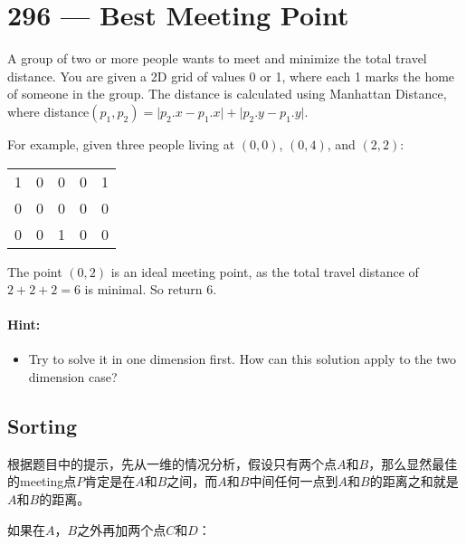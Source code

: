 \section{296 --- Best Meeting Point}
A group of two or more people wants to meet and minimize the total travel distance. You are given a 2D grid of values 0 or 1, where each 1 marks the home of someone in the group. The distance is calculated using Manhattan Distance, where distance$(p_1, p_2) = \lvert p_2.x - p_1.x\rvert + \lvert p_2.y - p_1.y \rvert$.
\par
For example, given three people living at $(0,0)$, $(0,4)$, and $(2,2)$:
\begin{table}[H]
\begin{tabular}{ccccc}
1 & 0 & 0 & 0 & 1\\
0 & 0 & 0 & 0 & 0\\
0 & 0 & 1 & 0 & 0
\end{tabular}
\end{table}
The point $(0,2)$ is an ideal meeting point, as the total travel distance of $2+2+2=6$ is minimal. So return 6.

\paragraph{Hint:}

\begin{itemize}
\item Try to solve it in one dimension first. How can this solution apply to the two dimension case?
\end{itemize}
\subsection{Sorting}
根据题目中的提示，先从一维的情况分析，假设只有两个点$A$和$B$，那么显然最佳的meeting点$P$肯定是在$A$和$B$之间，而$A$和$B$中间任何一点到$A$和$B$的距离之和就是$A$和$B$的距离。
\begin{figure}[H]
\end{figure}

如果在$A$，$B$之外再加两个点$C$和$D$：

